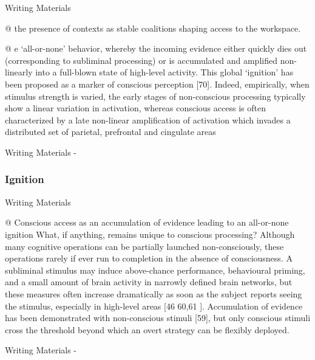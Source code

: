 \documentclass[utf8]{article}
\newenvironment{WritingMaterials} %
    	{
            \begin{tcolorbox}[enhanced,
                title=-,
                size=small,
                colbacktitle=Aquamarine,
                drop fuzzy shadow,
                fontupper=\small,
                boxrule=0.4pt,
                colback=Aquamarine!10!white,
                sharp corners]
                Writing Materials
            \end{tcolorbox}
            \begin{easylist}[itemize]
    	}
    	{
            \end{easylist}  
            \begin{tcolorbox}[enhanced,
                halign=flush right,
                halign title=right,
                size=small,
                colbacktitle=Aquamarine,
                drop fuzzy shadow,
                fontupper=\small,
                boxrule=0.4pt,
                colback=Aquamarine,
                colupper=White,
                sharp corners]
                Writing Materials -
            \end{tcolorbox}        
    	}
\begin{document}
				\begin{WritingMaterials}
					@ the presence of contexts as stable coalitions shaping access to the workspace.

					@ e ‘all-or-none’ behavior, whereby the incoming evidence either quickly dies out (corresponding to subliminal processing) or is accumulated and ampliﬁed non-linearly into a full-blown state of high-level activity. This global ‘ignition’ has been proposed as a marker of conscious perception [70]. Indeed, empirically, when stimulus strength is varied, the early stages of non-conscious processing typically show a linear variation in activation, whereas conscious access is often characterized by a late non-linear ampliﬁcation of activation which invades a distributed set of parietal, prefrontal and cingulate areas
				\end{WritingMaterials}






			\subsubsection{Ignition}
				\begin{WritingMaterials}
					@ Conscious access as an accumulation of evidence leading to an all-or-none ignition What, if anything, remains unique to conscious processing? Although many cognitive operations can be partially launched non-consciously, these operations rarely if ever run to completion in the absence of consciousness. A subliminal stimulus may induce above-chance performance, behavioural priming, and a small amount of brain activity in narrowly deﬁned brain networks, but these measures often increase dramatically as soon as the subject reports seeing the stimulus, especially in high-level areas [46 60,61  ]. Accumulation of evidence has been demonstrated with non-conscious stimuli [59], but only conscious stimuli cross the threshold beyond which an overt strategy can be ﬂexibly deployed. 
				\end{WritingMaterials}
\end{document}
